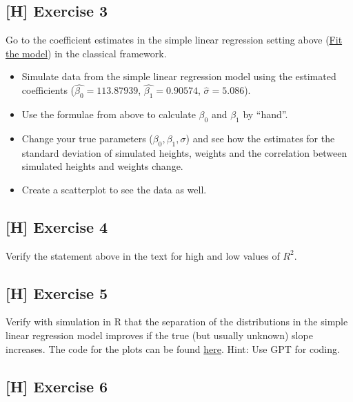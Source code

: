\documentclass[
]{book}
\providecommand{\tightlist}{%
  \setlength{\itemsep}{0pt}\setlength{\parskip}{0pt}}
\begin{document}
\subsection{{[}H{]} Exercise 3}\label{exercise3_simpl_lin_reg}

Go to the coefficient estimates in the simple linear regression setting
above (\hyperref[fit_model_simple_lin_reg_classic]{Fit the model})
in the classical framework.

\begin{itemize}
\tightlist
\item
  Simulate data from the simple linear regression model
  using the estimated coefficients (\(\hat{\beta_0} = 113.87939\),
  \(\hat{\beta_1} = 0.90574\), \(\hat{\sigma} = 5.086\)).
\item
  Use the formulae from above to calculate \(\beta_0\) and \(\beta_1\) by ``hand''.
\item
  Change your true parameters (\(\beta_0, \beta_1, \sigma\)) and see how the
  estimates for the standard deviation of simulated heights, weights
  and the correlation between simulated heights and weights change.
\item
  Create a scatterplot to see the data as well.
\end{itemize}

\subsection{{[}H{]} Exercise 4}\label{exercise4_simpl_lin_reg}

Verify the statement above in the text for high and low values of \(R^2\).

\subsection{{[}H{]} Exercise 5}\label{exercise5_simpl_lin_reg}

Verify with simulation in R that the separation of the distributions in the simple linear regression model
improves if the true (but usually unknown) slope increases.
The code for the plots can be found
\href{https://github.com/jdegenfellner/Script_QM2_ZHAW/blob/main/02-Simple_Linear_Regression.Rmd}{here}.
Hint: Use GPT for coding.

\subsection{{[}H{]} Exercise 6}\label{exercise6_simpl_lin_reg}
\end{document}
